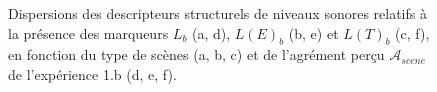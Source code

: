 \begin{figure}[t]
       \caption{Dispersions  des descripteurs structurels de niveaux sonores relatifs à la présence des marqueurs $L_b$ (a, d), $L(E)_b$ (b, e) et $L(T)_b$ (c, f), en fonction du type de scènes (a, b, c) et de l'agrément perçu $\mathcal{A}_{scene}$ de l'expérience 1.b (d, e, f).}\label{fig:soundlevelNoise}
\end{figure}

